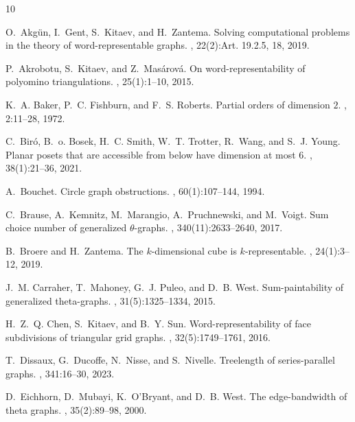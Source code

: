 \documentclass{llncs}
\begin{document}
\begin{thebibliography}{10}
	
	O.~Akg\"{u}n, I.~Gent, S.~Kitaev, and H.~Zantema.
	\newblock Solving computational problems in the theory of word-representable
	graphs.
	, 22(2):Art. 19.2.5, 18, 2019.
	
	P.~Akrobotu, S.~Kitaev, and Z.~Mas\'{a}rov\'{a}.
	\newblock On word-representability of polyomino triangulations.
	, 25(1):1--10, 2015.
	
	K.~A. Baker, P.~C. Fishburn, and F.~S. Roberts.
	\newblock Partial orders of dimension {$2$}.
	, 2:11--28, 1972.
	
	C.~Bir\'o, B.~o. Bosek, H.~C. Smith, W.~T. Trotter, R.~Wang, and S.~J. Young.
	\newblock Planar posets that are accessible from below have dimension at most
	6.
	, 38(1):21--36, 2021.
	
	A.~Bouchet.
	\newblock Circle graph obstructions.
	, 60(1):107--144, 1994.
	
	C.~Brause, A.~Kemnitz, M.~Marangio, A.~Pruchnewski, and M.~Voigt.
	\newblock Sum choice number of generalized {$\theta$}-graphs.
	, 340(11):2633--2640, 2017.
	
	B.~Broere and H.~Zantema.
	\newblock The {$k$}-dimensional cube is {$k$}-representable.
	, 24(1):3--12, 2019.
	
	J.~M. Carraher, T.~Mahoney, G.~J. Puleo, and D.~B. West.
	\newblock Sum-paintability of generalized theta-graphs.
	, 31(5):1325--1334, 2015.
	
	H.~Z.~Q. Chen, S.~Kitaev, and B.~Y. Sun.
	\newblock Word-representability of face subdivisions of triangular grid graphs.
	, 32(5):1749--1761, 2016.
	
	T.~Dissaux, G.~Ducoffe, N.~Nisse, and S.~Nivelle.
	\newblock Treelength of series-parallel graphs.
	, 341:16--30, 2023.
	
	D.~Eichhorn, D.~Mubayi, K.~O'Bryant, and D.~B. West.
	\newblock The edge-bandwidth of theta graphs.
	, 35(2):89--98, 2000.
	

\end{thebibliography}
\end{document}
